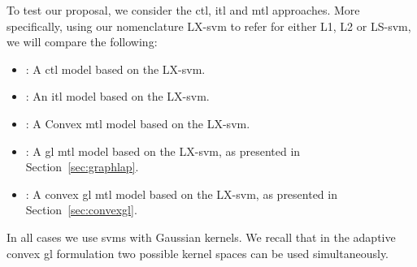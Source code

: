 To test our proposal, we consider the \acrshort{ctl}, \acrshort{itl} and \acrshort{mtl} approaches. More specifically, using our nomenclature LX-\acrshort{svm} to refer for either L1, L2 or LS-\acrshort{svm}, we will compare the following:
\begin{itemize}
    \item {}: A \acrshort{ctl} model based on the LX-\acrshort{svm}.
    \item {}: An \acrshort{itl} model based on the LX-\acrshort{svm}.
    \item {}: A Convex \acrshort{mtl} model based on the LX-\acrshort{svm}.
    \item {}: A \acrshort{gl} \acrshort{mtl} model based on the LX-\acrshort{svm}, as presented in Section~\ref{sec:graphlap}.
    \item {}: A convex \acrshort{gl} \acrshort{mtl} model based on the LX-\acrshort{svm}, as presented in Section~\ref{sec:convexgl}.
\end{itemize}
In all cases we use \acrshort{svms} with Gaussian kernels. We recall that in the adaptive convex \acrshort{gl} formulation two possible kernel spaces can be used simultaneously.




